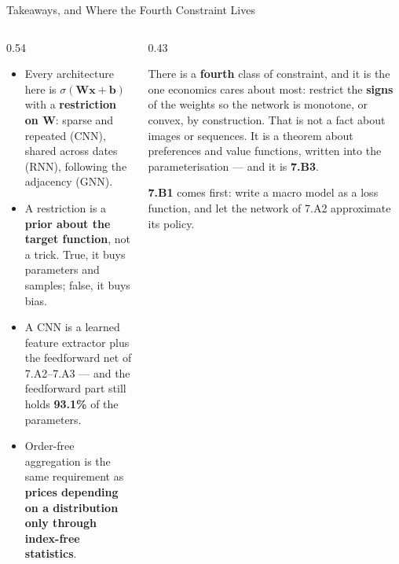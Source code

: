 \begin{frame}{Takeaways, and Where the Fourth Constraint Lives}
\begin{columns}[T]
\begin{column}{0.54\textwidth}
\begin{takeawaybox}\small
\begin{itemize}\small\setlength{\itemsep}{1.2mm}
  \item Every architecture here is $\sigma(\mathbf{W}\mathbf{x}+\mathbf{b})$ with a \textbf{restriction on $\mathbf{W}$}: sparse and repeated (CNN), shared across dates (RNN), following the adjacency (GNN).
  \item A restriction is a \textbf{prior about the target function}, not a trick. True, it buys parameters and samples; false, it buys bias.
  \item A CNN is a learned feature extractor plus the feedforward net of 7.A2--7.A3 --- and the feedforward part still holds \textbf{93.1\%} of the parameters.
  \item Order-free aggregation is the same requirement as \textbf{prices depending on a distribution only through index-free statistics}.
\end{itemize}
\end{takeawaybox}
\end{column}
\begin{column}{0.43\textwidth}
\begin{conceptbox}[title=\textbf{Bridge to Block B}]\small
There is a \textbf{fourth} class of constraint, and it is the one economics cares about most: restrict the \textbf{signs} of the weights so the network is monotone, or convex, by construction.
\medskip
That is not a fact about images or sequences. It is a theorem about preferences and value functions, written into the parameterisation --- and it is \textbf{7.B3}.
\end{conceptbox}
\medskip
\begin{examplebox}\footnotesize
\textbf{7.B1} comes first: write a macro model as a loss function, and let the network of 7.A2 approximate its policy.
\end{examplebox}
\end{column}
\end{columns}
\end{frame}


